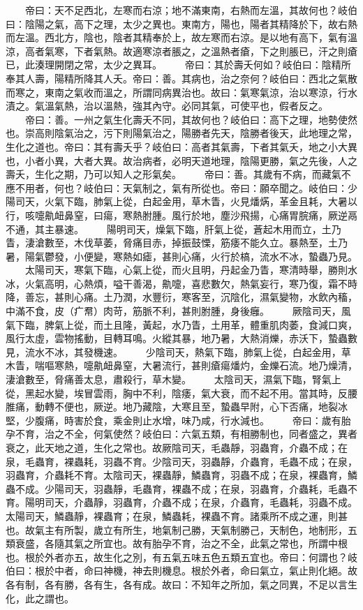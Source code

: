 　　帝曰：天不足西北，左寒而右涼；地不滿東南，右熱而左溫，其故何也？岐伯曰：陰陽之氣，高下之理，太少之異也。東南方，陽也，陽者其精降於下，故右熱而左溫。西北方，陰也，陰者其精奉於上，故左寒而右涼。是以地有高下，氣有溫涼，高者氣寒，下者氣熱。故適寒涼者脹之，之溫熱者瘡，下之則脹已，汗之則瘡已，此湊理開閉之常，太少之異耳。
　　帝曰：其於壽夭何如？岐伯曰：陰精所奉其人壽，陽精所降其人夭。帝曰：善。其病也，治之奈何？岐伯曰：西北之氣散而寒之，東南之氣收而溫之，所謂同病異治也。故曰：氣寒氣涼，治以寒涼，行水漬之。氣溫氣熱，治以溫熱，強其內守。必同其氣，可使平也，假者反之。
　　帝曰：善。一州之氣生化壽夭不同，其故何也？岐伯曰：高下之理，地勢使然也。崇高則陰氣治之，污下則陽氣治之，陽勝者先天，陰勝者後天，此地理之常，生化之道也。帝曰：其有壽夭乎？岐伯曰：高者其氣壽，下者其氣夭，地之小大異也，小者小異，大者大異。故治病者，必明天道地理，陰陽更勝，氣之先後，人之壽夭，生化之期，乃可以知人之形氣矣。
　　帝曰：善。其歲有不病，而藏氣不應不用者，何也？岐伯曰：天氣制之，氣有所從也。帝曰：願卒聞之。岐伯曰：少陽司天，火氣下臨，肺氣上從，白起金用，草木眚，火見燔焫，革金且耗，大暑以行，咳嚏鼽衄鼻窒，曰瘍，寒熱胕腫。風行於地，塵沙飛揚，心痛胃脘痛，厥逆鬲不通，其主暴速。
　　陽明司天，燥氣下臨，肝氣上從，蒼起木用而立，土乃眚，淒滄數至，木伐草萎，脅痛目赤，掉振鼓慄，筋痿不能久立。暴熱至，土乃暑，陽氣鬱發，小便變，寒熱如瘧，甚則心痛，火行於槁，流水不冰，蟄蟲乃見。
　　太陽司天，寒氣下臨，心氣上從，而火且明，丹起金乃眚，寒清時舉，勝則水冰，火氣高明，心熱煩，嗌干善渴，鼽嚏，喜悲數欠，熱氣妄行，寒乃復，霜不時降，善忘，甚則心痛。土乃潤，水豐衍，寒客至，沉陰化，濕氣變物，水飲內稸，中滿不食，皮（疒帬）肉苛，筋脈不利，甚則胕腫，身後癰。
　　厥陰司天，風氣下臨，脾氣上從，而土且隆，黃起，水乃眚，土用革，體重肌肉萎，食減口爽，風行太虛，雲物搖動，目轉耳鳴。火縱其暴，地乃暑，大熱消爍，赤沃下，蟄蟲數見，流水不冰，其發機速。
　　少陰司天，熱氣下臨，肺氣上從，白起金用，草木眚，喘嘔寒熱，嚏鼽衄鼻窒，大暑流行，甚則瘡瘍燔灼，金爍石流。地乃燥清，淒滄數至，脅痛善太息，肅殺行，草木變。
　　太陰司天，濕氣下臨，腎氣上從，黑起水變，埃冒雲雨，胸中不利，陰痿，氣大衰，而不起不用。當其時，反腰脽痛，動轉不便也，厥逆。地乃藏陰，大寒且至，蟄蟲早附，心下否痛，地裂冰堅，少腹痛，時害於食，乘金則止水增，味乃咸，行水減也。
　　帝曰：歲有胎孕不育，治之不全，何氣使然？岐伯曰：六氣五類，有相勝制也，同者盛之，異者衰之，此天地之道，生化之常也。故厥陰司天，毛蟲靜，羽蟲育，介蟲不成；在泉，毛蟲育，裸蟲耗，羽蟲不育。少陰司天，羽蟲靜，介蟲育，毛蟲不成；在泉，羽蟲育，介蟲耗不育。太陰司天，裸蟲靜，鱗蟲育，羽蟲不成；在泉，裸蟲育，鱗蟲不成。少陽司天，羽蟲靜，毛蟲育，裸蟲不成；在泉，羽蟲育，介蟲耗，毛蟲不育。陽明司天，介蟲靜，羽蟲育，介蟲不成；在泉，介蟲育，毛蟲耗，羽蟲不成。太陽司天，鱗蟲靜，裸蟲育；在泉，鱗蟲耗，裸蟲不育。諸乘所不成之運，則甚也。故氣主有所製，歲立有所生，地氣制己勝，天氣制勝己，天制色，地制形，五類衰盛，各隨其氣之所宜也。故有胎孕不育，治之不全，此氣之常也，所謂中根也。根於外者亦五，故生化之別，有五氣五味五色五類五宜也。帝曰：何謂也？岐伯曰：根於中者，命曰神機，神去則機息。根於外者，命曰氣立，氣止則化絕。故各有制，各有勝，各有生，各有成。故曰：不知年之所加，氣之同異，不足以言生化，此之謂也。
